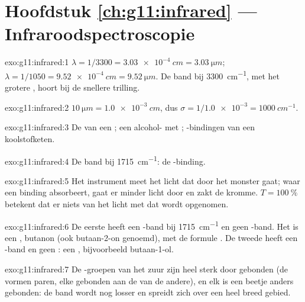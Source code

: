 \section*{Hoofdstuk \ref{ch:g11:infrared} --- Infraroodspectroscopie}

\begin{solution}{exo:g11:infrared:1}
$\lambda = 1/3300 = \qty{3.03e-4}{cm} = \qty{3.03}{\micro m}$;
$\lambda = 1/1050 = \qty{9.52e-4}{cm} = \qty{9.52}{\micro m}$. De band bij
\qty{3300}{cm^{-1}}, met het grotere , hoort bij de snellere
trilling.
\end{solution}

\begin{solution}{exo:g11:infrared:2}
$\qty{10}{\micro m} = \qty{1.0e-3}{cm}$, dus $\sigma = 1/\num{1.0e-3} =
\qty{1000}{cm^{-1}}$.
\end{solution}

\begin{solution}{exo:g11:infrared:3}
De  van een ; een alcohol- met ;
-bindingen van een koolstofketen.
\end{solution}

\begin{solution}{exo:g11:infrared:4}
De band bij \qty{1715}{cm^{-1}}: de -binding.
\end{solution}

\begin{solution}{exo:g11:infrared:5}
Het instrument meet het licht dat door het monster gaat; waar een binding
absorbeert, gaat er minder licht door en zakt de kromme. $T =
\qty{100}{\percent}$ betekent dat er niets van het licht met dat 
wordt opgenomen.
\end{solution}

\begin{solution}{exo:g11:infrared:6}
De eerste heeft een -band bij \qty{1715}{cm^{-1}} en geen
-band. Het is een , butanon (ook
butaan-2-on genoemd), met de formule . De tweede heeft een -band en geen
: een , bijvoorbeeld butaan-1-ol.
\end{solution}

\begin{solution}{exo:g11:infrared:7}
De -groepen van het zuur zijn heel sterk door 
gebonden (de  vormen paren, elke  gebonden aan de
 van de andere), en elk  is een beetje anders gebonden:
de band wordt nog losser en spreidt zich over een heel breed gebied.
\end{solution}

